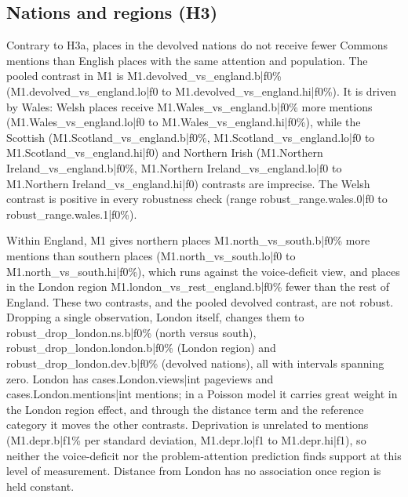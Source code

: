 \documentclass[11pt,a4paper]{article}
\begin{document}
\subsection{Nations and regions (H3)}
Contrary to H3a, places in the devolved nations do not receive fewer Commons mentions than English places with the same attention and population. The pooled contrast in M1 is {{M1.devolved_vs_england.b|f0}}\% ({{M1.devolved_vs_england.lo|f0}} to {{M1.devolved_vs_england.hi|f0}}\%). It is driven by Wales: Welsh places receive {{M1.Wales_vs_england.b|f0}}\% more mentions ({{M1.Wales_vs_england.lo|f0}} to {{M1.Wales_vs_england.hi|f0}}\%), while the Scottish ({{M1.Scotland_vs_england.b|f0}}\%, {{M1.Scotland_vs_england.lo|f0}} to {{M1.Scotland_vs_england.hi|f0}}) and Northern Irish ({{M1.Northern Ireland_vs_england.b|f0}}\%, {{M1.Northern Ireland_vs_england.lo|f0}} to {{M1.Northern Ireland_vs_england.hi|f0}}) contrasts are imprecise. The Welsh contrast is positive in every robustness check (range {{robust_range.wales.0|f0}} to {{robust_range.wales.1|f0}}\%).

Within England, M1 gives northern places {{M1.north_vs_south.b|f0}}\% more mentions than southern places ({{M1.north_vs_south.lo|f0}} to {{M1.north_vs_south.hi|f0}}\%), which runs against the voice-deficit view, and places in the London region {{M1.london_vs_rest_england.b|f0}}\% fewer than the rest of England. These two contrasts, and the pooled devolved contrast, are not robust. Dropping a single observation, London itself, changes them to {{robust_drop_london.ns.b|f0}}\% (north versus south), {{robust_drop_london.london.b|f0}}\% (London region) and {{robust_drop_london.dev.b|f0}}\% (devolved nations), all with intervals spanning zero. London has {{cases.London.views|int}} pageviews and {{cases.London.mentions|int}} mentions; in a Poisson model it carries great weight in the London region effect, and through the distance term and the reference category it moves the other contrasts. Deprivation is unrelated to mentions ({{M1.depr.b|f1}}\% per standard deviation, {{M1.depr.lo|f1}} to {{M1.depr.hi|f1}}), so neither the voice-deficit nor the problem-attention prediction finds support at this level of measurement. Distance from London has no association once region is held constant.
\end{document}
